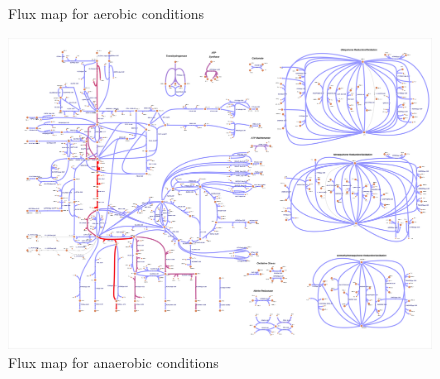 \documentclass{scrartcl}
\begin{document}
\begin{enumerate}
\begin{figure}[H]
	\caption{Flux map for aerobic conditions}
\end{figure}
\begin{figure}[H]
	\centering
	\includegraphics[max width=\linewidth]{src/2_b.pdf}
	\caption{Flux map for anaerobic conditions}
\end{figure}
\end{enumerate}
\end{document}
